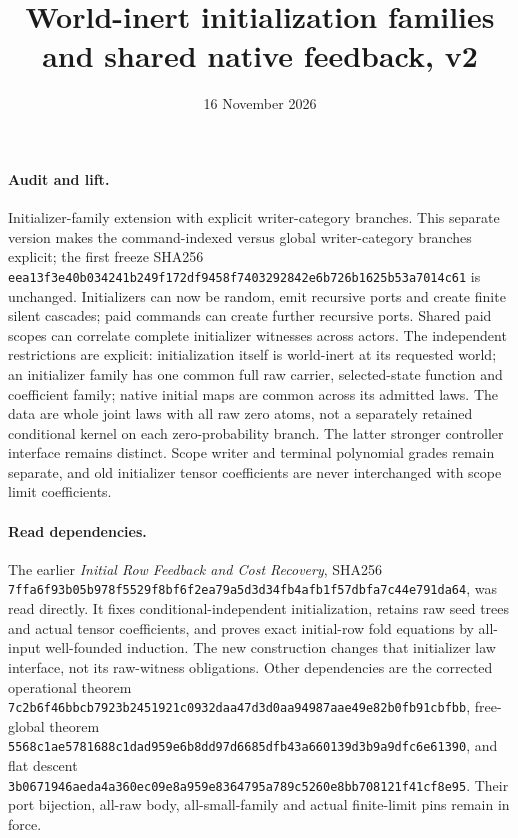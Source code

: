 \documentclass[11pt]{article}
\title{World-inert initialization families and shared native feedback, v2}
\date{16 November 2026}
\begin{document}
\maketitle
\paragraph{Audit and lift.} Initializer-family extension with explicit writer-category branches. This separate version makes the command-indexed versus global writer-category branches explicit; the first freeze SHA256 \texttt{eea13f3e40b034241b249f172df9458f7403292842e6b726b1625b53a7014c61} is unchanged. Initializers can now be random, emit recursive ports and create finite silent cascades; paid commands can create further recursive ports. Shared paid scopes can correlate complete initializer witnesses across actors. The independent restrictions are explicit: initialization itself is world-inert at its requested world; an initializer family has one common full raw carrier, selected-state function and coefficient family; native initial maps are common across its admitted laws. The data are whole joint laws with all raw zero atoms, not a separately retained conditional kernel on each zero-probability branch. The latter stronger controller interface remains distinct. Scope writer and terminal polynomial grades remain separate, and old initializer tensor coefficients are never interchanged with scope limit coefficients.

\paragraph{Read dependencies.} The earlier \emph{Initial Row Feedback and Cost Recovery}, SHA256 \texttt{7ffa6f93b05b978f5529f8bf6f2ea79a5d3d34fb4afb1f57dbfa7c44e791da64}, was read directly. It fixes conditional-independent initialization, retains raw seed trees and actual tensor coefficients, and proves exact initial-row fold equations by all-input well-founded induction. The new construction changes that initializer law interface, not its raw-witness obligations. Other dependencies are the corrected operational theorem \texttt{7c2b6f46bbcb7923b2451921c0932daa47d3d0aa94987aae49e82b0fb91cbfbb}, free-global theorem \texttt{5568c1ae5781688c1dad959e6b8dd97d6685dfb43a660139d3b9a9dfc6e61390}, and flat descent \texttt{3b0671946aeda4a360ec09e8a959e8364795a789c5260e8bb708121f41cf8e95}. Their port bijection, all-raw body, all-small-family and actual finite-limit pins remain in force.
\end{document}
